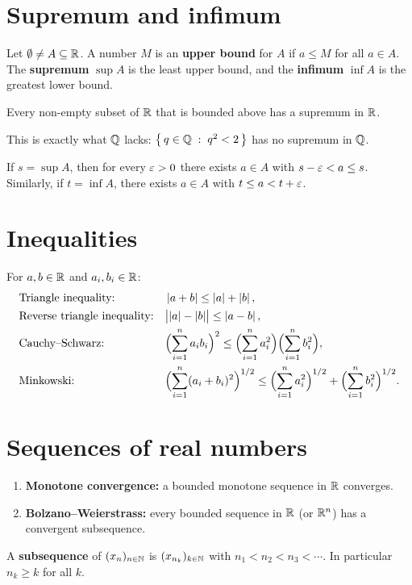 \section{Supremum and infimum}
\begin{definition}
Let $\emptyset\ne A\subseteq\mathbb{R}$. A number $M$ is an \textbf{upper bound} for $A$ if $a\le M$ for all $a\in A$. The \textbf{supremum} $\sup A$ is the least upper bound, and the \textbf{infimum} $\inf A$ is the greatest lower bound.
\end{definition}

\begin{theorem}
Every non-empty subset of $\mathbb{R}$ that is bounded above has a supremum in $\mathbb{R}$.
\end{theorem}
This is exactly what $\mathbb{Q}$ lacks: $\left\{\, q\in\mathbb{Q} \;:\; q^2<2 \,\right\}$ has no supremum in $\mathbb{Q}$.

\begin{proposition}\label{prop:approx}
If $s=\sup A$, then for every $\varepsilon>0$ there exists $a\in A$ with $s-\varepsilon<a\le s$. Similarly, if $t=\inf A$, there exists $a\in A$ with $t\le a<t+\varepsilon$.
\end{proposition}

\section{Inequalities}
For $a,b\in\mathbb{R}$ and $a_i,b_i\in\mathbb{R}$:
\begin{align*}
  &\text{Triangle inequality:} && \left\lvert a+b\right\rvert\le\left\lvert a\right\rvert+\left\lvert b\right\rvert,\\
  &\text{Reverse triangle inequality:} && \bigl|\left\lvert a\right\rvert-\left\lvert b\right\rvert\bigr|\le\left\lvert a-b\right\rvert,\\
  &\text{Cauchy--Schwarz:} && \Bigl(\sum_{i=1}^n a_ib_i\Bigr)^2\le\Bigl(\sum_{i=1}^n a_i^2\Bigr)\Bigl(\sum_{i=1}^n b_i^2\Bigr),\\
  &\text{Minkowski:} && \Bigl(\sum_{i=1}^n (a_i+b_i)^2\Bigr)^{1/2}\le\Bigl(\sum_{i=1}^n a_i^2\Bigr)^{1/2}+\Bigl(\sum_{i=1}^n b_i^2\Bigr)^{1/2}.
\end{align*}

\section{Sequences of real numbers}
\begin{theorem}
\leavevmode
\begin{enumerate}[label=(\roman*)]
  \item \textbf{Monotone convergence:} a bounded monotone sequence in $\mathbb{R}$ converges.
  \item \textbf{Bolzano--Weierstrass:} every bounded sequence in $\mathbb{R}$ (or $\mathbb{R}^n$) has a convergent subsequence.
\end{enumerate}
\end{theorem}
A \textbf{subsequence} of $(x_n)_{n\in\mathbb{N}}$ is $(x_{n_k})_{k\in\mathbb{N}}$ with $n_1<n_2<n_3<\cdots$. In particular $n_k\ge k$ for all $k$.
